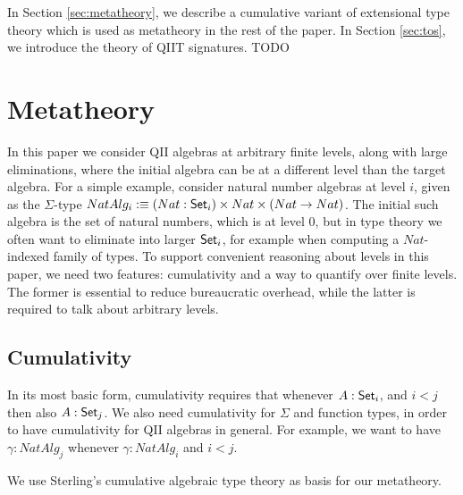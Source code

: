 \documentclass[sigplan,review,anonymous]{acmart}\settopmatter{printfolios=true,printccs=false,printacmref=false}
\begin{document}
In Section \ref{sec:metatheory}, we describe a cumulative variant of extensional type
theory which is used as metatheory in the rest of the paper. In Section \ref{sec:tos},
we introduce the theory of QIIT signatures. TODO

\section{Metatheory}

In this paper we consider QII algebras at arbitrary finite levels, along with
large eliminations, where the initial algebra can be at a different level than
the target algebra. For a simple example, consider natural number algebras at
level $i$, given as the $\Sigma$-type $NatAlg_i :\equiv(Nat : \mathsf{Set}_i)\times
Nat\times(Nat \rightarrow Nat)$. The initial such algebra is the set of natural numbers,
which is at level $0$, but in type theory we often want to eliminate into larger
$\mathsf{Set}_i$, for example when computing a $Nat$-indexed family of types. To support
convenient reasoning about levels in this paper, we need two features:
cumulativity and a way to quantify over finite levels. The former is essential
to reduce bureaucratic overhead, while the latter is required to talk about
arbitrary levels.

\subsection{Cumulativity}


In its most basic form, cumulativity requires that whenever $A : \mathsf{Set}_i$, and $i
< j$ then also $A : \mathsf{Set}_j$. We also need cumulativity for $\Sigma$ and function
types, in order to have cumulativity for QII algebras in general. For example,
we want to have $\gamma : NatAlg_j$ whenever $\gamma : NatAlg_i$ and $i < j$.

We use Sterling's cumulative algebraic type theory \cite{sterling2019algebraic} as basis for our metatheory. 

\end{document}
